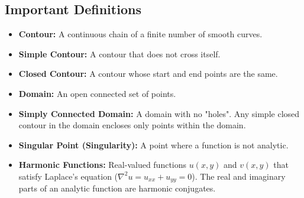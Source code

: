 \documentclass{../cheatsheet}
\begin{document}
\begin{multicols}{3}
\section{Important Definitions}

\begin{itemize}
    \item \textbf{Contour:} A continuous chain of a finite number of smooth curves.
    \item \textbf{Simple Contour:} A contour that does not cross itself.
    \item \textbf{Closed Contour:} A contour whose start and end points are the same.
    \item \textbf{Domain:} An open connected set of points.
    \item \textbf{Simply Connected Domain:} A domain with no "holes". Any simple closed contour in the domain encloses only points within the domain.
    \item \textbf{Singular Point (Singularity):} A point where a function is not analytic.
    \item \textbf{Harmonic Functions:} Real-valued functions $u(x,y)$ and $v(x,y)$ that satisfy Laplace's equation ($\nabla^2 u = u_{xx} + u_{yy} = 0$). The real and imaginary parts of an analytic function are harmonic conjugates.
\end{itemize}

\end{multicols}
\end{document}
